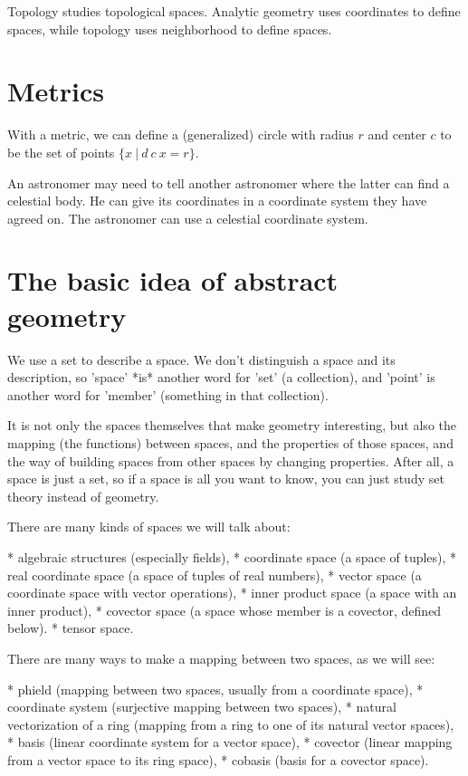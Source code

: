 Topology studies topological spaces.
Analytic geometry uses coordinates to define spaces,
while topology uses neighborhood to define spaces.

\section{Metrics}

With a metric, we can define
a (generalized) circle with radius $r$ and center $c$
to be the set of points
$\{x ~|~ d~c~x = r \}$.

An astronomer may need to tell another astronomer where the latter can find a celestial body.
He can give its coordinates in a coordinate system they have agreed on.
The astronomer can use a celestial coordinate system.

\section{The basic idea of abstract geometry}

We use a set to describe a space.
We don't distinguish a space and its description,
so 'space' *is* another word for 'set' (a collection),
and 'point' is another word for 'member' (something in that collection).

It is not only the spaces themselves that make geometry interesting,
but also the mapping (the functions) between spaces,
and the properties of those spaces,
and the way of building spaces from other spaces by changing properties.
After all, a space is just a set,
so if a space is all you want to know,
you can just study set theory instead of geometry.

There are many kinds of spaces we will talk about:

* algebraic structures (especially fields),
* coordinate space (a space of tuples),
* real coordinate space (a space of tuples of real numbers),
* vector space (a coordinate space with vector operations),
* inner product space (a space with an inner product),
* covector space (a space whose member is a covector, defined below).
* tensor space.

There are many ways to make a mapping between two spaces,
as we will see:

* phield (mapping between two spaces, usually from a coordinate space),
* coordinate system (surjective mapping between two spaces),
* natural vectorization of a ring (mapping from a ring to one of its natural vector spaces),
* basis (linear coordinate system for a vector space),
* covector (linear mapping from a vector space to its ring space),
* cobasis (basis for a covector space).

